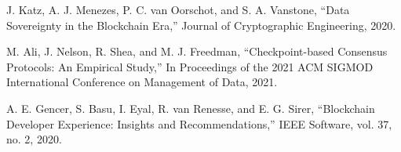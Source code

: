 \begin{thebibliography}{99}
J. Katz, A. J. Menezes, P. C. van Oorschot, and S. A. Vanstone,
``Data Sovereignty in the Blockchain Era,''
Journal of Cryptographic Engineering, 2020.

M. Ali, J. Nelson, R. Shea, and M. J. Freedman,
``Checkpoint-based Consensus Protocols: An Empirical Study,''
In Proceedings of the 2021 ACM SIGMOD International Conference on Management of Data, 2021.

A. E. Gencer, S. Basu, I. Eyal, R. van Renesse, and E. G. Sirer,
``Blockchain Developer Experience: Insights and Recommendations,''
IEEE Software, vol. 37, no. 2, 2020.

\end{thebibliography} 